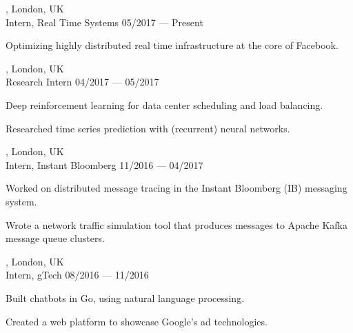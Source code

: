 
\begin{entry}
	{, London, UK}
	{\\Intern, Real Time Systems}
	{05/2017 --- Present}
  \vspace{-1mm}
	\item Optimizing highly distributed real time infrastructure at the core of Facebook.
\end{entry}

\begin{entry}
	{, London, UK}
	{\\Research Intern}
	{04/2017 --- 05/2017}
  \vspace{-1mm}
  \item Deep reinforcement learning for data center scheduling and load balancing.
  \item Researched time series prediction with (recurrent) neural networks.
\end{entry}

\begin{entry}
	{, London, UK}
	{\\Intern, Instant Bloomberg}
	{11/2016 --- 04/2017}
  \vspace{-1mm}
  \item Worked on distributed message tracing in the Instant Bloomberg (IB) messaging system.
  \item Wrote a network traffic simulation tool that produces messages to Apache Kafka message queue clusters.
\end{entry}

\begin{entry}
  {, London, UK}
	{\\Intern, gTech}
	{08/2016 --- 11/2016}
  \vspace{-1mm}
  \item Built chatbots in Go, using natural language processing.
  \item Created a web platform to showcase Google's ad technologies.
\end{entry}

